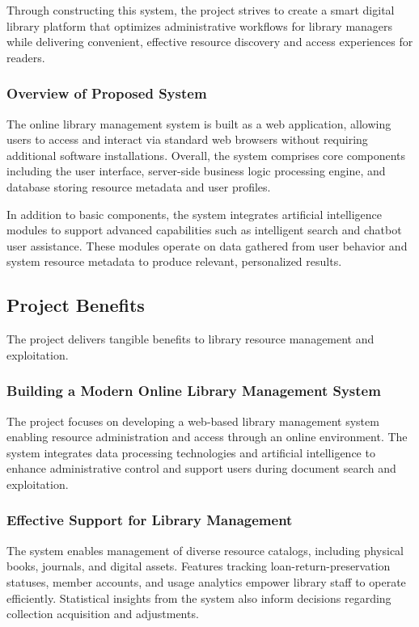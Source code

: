 Through constructing this system, the project strives to create a smart digital library platform that optimizes administrative workflows for library managers while delivering convenient, effective resource discovery and access experiences for readers.

\subsubsection{Overview of Proposed System}

The online library management system is built as a web application, allowing users to access and interact via standard web browsers without requiring additional software installations. Overall, the system comprises core components including the user interface, server-side business logic processing engine, and database storing resource metadata and user profiles.

In addition to basic components, the system integrates artificial intelligence modules to support advanced capabilities such as intelligent search and chatbot user assistance. These modules operate on data gathered from user behavior and system resource metadata to produce relevant, personalized results.

\subsection{Project Benefits}

The project delivers tangible benefits to library resource management and exploitation.

\subsubsection{Building a Modern Online Library Management System}

The project focuses on developing a web-based library management system enabling resource administration and access through an online environment. The system integrates data processing technologies and artificial intelligence to enhance administrative control and support users during document search and exploitation.

\subsubsection{Effective Support for Library Management}

The system enables management of diverse resource catalogs, including physical books, journals, and digital assets. Features tracking loan-return-preservation statuses, member accounts, and usage analytics empower library staff to operate efficiently. Statistical insights from the system also inform decisions regarding collection acquisition and adjustments.

